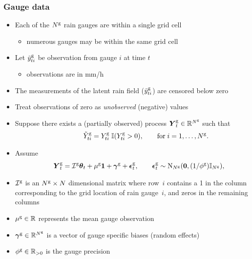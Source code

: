 \begin{frame}
\frametitle{Gauge data}
\begin{itemize}
\item Each of the ${N^\text{g}}$ rain gauges are within a single grid cell
\begin{itemize}
\medskip
\item numerous gauges may be within the same grid cell
\end{itemize}
\medskip
\item Let $\tilde{y}^{\text{g}}_{ti}$ be observation from gauge $i$ at time $t$
\begin{itemize}
\medskip
\item observations are in mm/h
\end{itemize}
\medskip
\item The measurements of the latent rain field ($\tilde{y}^{\text{g}}_{ti}$) are censored below zero
\medskip
\item Treat observations of zero as \textit{unobserved} (negative) values
\medskip
\item Suppose there exists a (partially observed) process $\boldsymbol{Y}_t^{\text{g}} \in \mathbb{R}^{N^\text{g}}$ such that
\begin{equation*}
\qquad \qquad \tilde{Y}_{ti}^{\text{g}} = Y_{ti}^{\text{g}} \; \mathbb{I}(Y_{ti}^{\text{g}} > 0), \qquad \text{for} \; i=1,\dots,{N^\text{g}}.
\end{equation*}
\end{itemize}
\end{frame}

\begin{frame}
\begin{itemize}
\bigskip
\item Assume
\begin{equation*}
\qquad  {\boldsymbol{Y}^\text{g}_t} = \mathcal{I}^{\text{g}} \boldsymbol{\theta}_t + \mu^{\text{g}} \boldsymbol{1} +  \boldsymbol{\gamma}^{\text{g}} + \boldsymbol{\epsilon}^{\text{g}}_t,  \qquad \boldsymbol{\epsilon}^{{\text{g}}}_t \sim \text{N}_{N^\text{g}}(\boldsymbol{0},(1/{\phi^\text{g}}) {\mathbb{I}_{N^\text{g}}} ),
\end{equation*}
\bigskip
\vspace{-0.7cm}
\item  $\mathcal{I}^{\text{g}}$ is an ${N^\text{g}} \times N$ dimensional matrix where row~$i$ contains a 1 in the column corresponding to the grid location of rain gauge~$i$, and zeros in the remaining columns
\bigskip
\item $\mu^{\text{g}} \in \mathbb{R}$ represents the mean gauge observation
\bigskip
\item $\boldsymbol{\gamma}^{\text{g}} \in \mathbb{R}^{N^\text{g}}$ is a vector of gauge specific biases (random effects)
\bigskip
\item ${\phi^\text{g}} \in \mathbb{R}_{>0}$ is the gauge precision
\end{itemize}
\end{frame}



